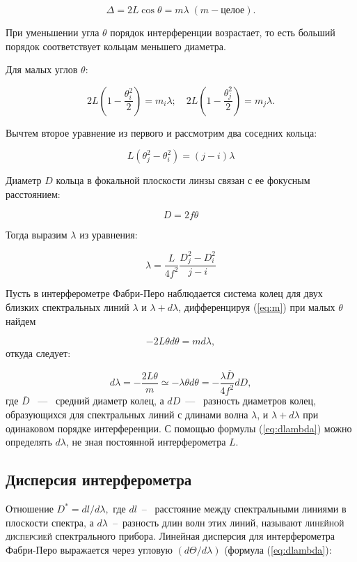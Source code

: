 \documentclass{letask}
\begin{document}
\begin{equation}
\label{eq:m}
\Delta = 2 L \cos \theta = m \lambda \; (m - \text{целое}).
\end{equation}

При уменьшении угла $\theta$ порядок интерференции возрастает, то есть больший порядок соответствует кольцам меньшего диаметра.

Для малых углов $\theta$:

\begin{equation}
2L \left( 1 - \dfrac{\theta_i^2}{2} \right) = m_i \lambda; \quad
2L \left( 1 - \dfrac{\theta_j^2}{2} \right) = m_j \lambda.
\end{equation}

Вычтем второе уравнение из первого и рассмотрим два соседних кольца:

\[
L(\theta_j^2-\theta_i^2) = (j - i) \lambda
\]

Диаметр $D$ кольца в фокальной плоскости линзы связан с ее фокусным расстоянием:

\[
D = 2 f \theta
\]

Тогда выразим $\lambda$ из уравнения:

\begin{equation}
\lambda = \dfrac{L}{4 f^2} \dfrac{D_j^2 - D_i^2}{j-i}
\end{equation}

Пусть в интерферометре Фабри-Перо наблюдается система колец для двух близких спектральных линий $\lambda$ и $\lambda + d\lambda$, дифференцируя (\ref{eq:m}) при малых $\theta$ найдем 

\[
-2L \theta d \theta = m d \lambda,
\] откуда следует:

\begin{equation}
d \lambda = - \dfrac{2 L \theta}{m} \simeq - \lambda \theta d \theta = - \dfrac{\lambda \overline{D}}{4 f^2} dD,
\label{eq:dlambda}
\end{equation}
где $\overline{D}$ ~---~ средний диаметр колец, а $dD$~---~ разность диаметров колец, образующихся для спектральных линий с длинами волна $\lambda$, и $\lambda + d\lambda$ при одинаковом порядке интерференции. С помощью формулы (\ref{eq:dlambda}) можно определять $d \lambda$, не зная постоянной интерферометра $L$.

\subsection*{Дисперсия интерферометра}

Отношение $D^* = dl /d\lambda,$ где $dl$~--~ расстояние между спектральными линиями в плоскости спектра, а $d\lambda$~--~разность длин волн этих линий, называют \textsc{линейной дисперсией} спектрального прибора. Линейная дисперсия для интерферометра Фабри-Перо выражается через угловую $(d \Theta / d \lambda)$ (формула (\ref{eq:dlambda}):
\end{document}
